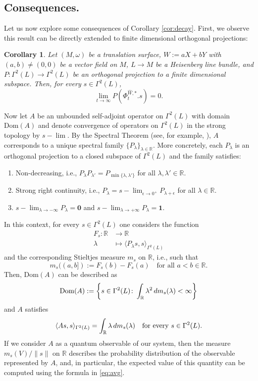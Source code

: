 \documentclass{amsart}
\newtheorem{corollary}[theorem]{Corollary}
\theoremstyle{definition}
\theoremstyle{remark}
\numberwithin{equation}{section}
\newcommand{\wW}{\widehat{W}}
\newcommand{\<}{{\langle}}
\renewcommand{\>}{{\rangle}}
\begin{document}
\subsection{Consequences.} Let us now explore some consequences of Corollary \ref{cor:decay}. First, we observe this result can be directly extended to finite dimensional orthogonal projections:

\begin{corollary}
    \label{cor:proj}
    Let $(M,\omega)$ be a translation surface, $W := aX+bY$ with $(a,b) \not = (0,0)$ be a vector field on $M$,  $L \to M$ be a Heisenberg line bundle, and $P \colon \Gamma^2(L) \to \Gamma^2(L)$ be an orthogonal projection to a finite dimensional subspace. Then, for every $s \in \Gamma^2(L)$,
    \[
    \lim_{t \to \infty} P\left(\Phi_t^{\wW,*}.s\right) = 0.
    \]
\end{corollary}

Now let $A$ be an unbounded self-adjoint operator on $\Gamma^2(L)$ with domain $\mathrm{Dom}(A)$ and denote convergence of operators on $\Gamma^2(L)$ in the strong topology by $s - \lim$. By the Spectral Theorem (see, for example, \cite[Theorem 7.20]{Hall}), $A$ corresponds to a unique spectral family $\{P_\lambda\}_{\lambda \in \mathbb{R}}$. More concretely, each $P_\lambda$ is an orthogonal projection to a closed subspace of $\Gamma^2(L)$ and the family satisfies:
\begin{enumerate}
    \item Non-decreasing, i.e., $P_\lambda P_{\lambda'} = P_{\min\{\lambda,\lambda'\}}$ for all $\lambda,\lambda' \in \mathbb{R}$.
    \item Strong right continuity, i.e., $P_\lambda = s - \lim_{\epsilon \to 0^+} P_{\lambda+\epsilon}$ for all $\lambda \in \mathbb{R}$.
    \item $s - \lim_{\lambda \to -\infty} P_\lambda =\mathbf{0}$ and $s - \lim_{\lambda \to +\infty} P_\lambda =\mathbf{1}$.
\end{enumerate}
In this context, for every $s \in \Gamma^2(L)$ one considers the function
\begin{align*}
F_s \colon \mathbb{R} &\to \mathbb{R} \\
\lambda &\mapsto \langle P_\lambda s, s\rangle_{\Gamma^2(L)}
\end{align*}
and the corresponding Stieltjes measure $m_s$ on $\mathbb{R}$, i.e., such that
\[
m_s((a,b]) := F_s(b) - F_s(a) \quad \text{for all } a <b \in \mathbb{R}.
\]
Then, $\mathrm{Dom}(A)$ can be described as
\[
\mathrm{Dom}(A) := \left\lbrace s \in \Gamma^2(L) \colon \int_\mathbb{R} \lambda^2 \thinspace dm_s(\lambda) < \infty\right\rbrace
\]
and $A$ satisfies
\begin{equation}
\label{eq:avg}
\langle As,s\rangle_{\Gamma^2(L)} = \int_\mathbb{R} \lambda \thinspace dm_s(\lambda) \quad \text{for every } s \in \Gamma^2(L).
\end{equation}
If we consider $A$ as a quantum observable of our system, then the measure $m_s(V) / \|s\|$ on $\mathbb{R}$ describes the probability distribution of the observable represented by $A$, and, in particular, the expected value of this quantity can be computed using the formula in \eqref{eq:avg}.
\end{document}
